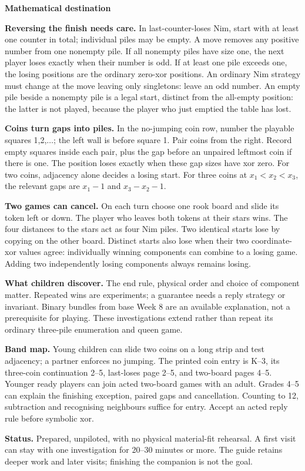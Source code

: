 \documentclass[11pt]{article}
\newcommand{\parttitle}[1]{{\large\bfseries\color{ink}#1}\par}
\newcommand{\labelled}[2]{\textbf{#1} #2\par}
\begin{document}
\parttitle{Mathematical destination}
\labelled{Reversing the finish needs care.}{In last-counter-loses Nim, start with at least one counter in total; individual piles may be empty. A move removes any positive number from one nonempty pile. If all nonempty piles have size one, the next player loses exactly when their number is odd. If at least one pile exceeds one, the losing positions are the ordinary zero-xor positions. An ordinary Nim strategy must change at the move leaving only singletons: leave an odd number. An empty pile beside a nonempty pile is a legal start, distinct from the all-empty position: the latter is not played, because the player who just emptied the table has lost.}
\labelled{Coins turn gaps into piles.}{In the no-jumping coin row, number the playable squares 1,2,$\ldots$; the left wall is before square 1. Pair coins from the right. Record empty squares inside each pair, plus the gap before an unpaired leftmost coin if there is one. The position loses exactly when these gap sizes have xor zero. For two coins, adjacency alone decides a losing start. For three coins at $x_1<x_2<x_3$, the relevant gaps are $x_1-1$ and $x_3-x_2-1$.}
\labelled{Two games can cancel.}{On each turn choose one rook board and slide its token left or down. The player who leaves both tokens at their stars wins. The four distances to the stars act as four Nim piles. Two identical starts lose by copying on the other board. Distinct starts also lose when their two coordinate-xor values agree: individually winning components can combine to a losing game. Adding two independently losing components always remains losing.}
\labelled{What children discover.}{The end rule, physical order and choice of component matter. Repeated wins are experiments; a guarantee needs a reply strategy or invariant. Binary bundles from base Week 8 are an available explanation, not a prerequisite for playing. These investigations extend rather than repeat its ordinary three-pile enumeration and queen game.}
\labelled{Band map.}{Young children can slide two coins on a long strip and test adjacency; a partner enforces no jumping. The printed coin entry is K--3, its three-coin continuation 2--5, last-loses page 2--5, and two-board pages 4--5. Younger ready players can join acted two-board games with an adult. Grades 4--5 can explain the finishing exception, paired gaps and cancellation. Counting to 12, subtraction and recognising neighbours suffice for entry. Accept an acted reply rule before symbolic xor.}
\labelled{Status.}{Prepared, unpiloted, with no physical material-fit rehearsal. A first visit can stay with one investigation for 20--30 minutes or more. The guide retains deeper work and later visits; finishing the companion is not the goal.}
\end{document}
